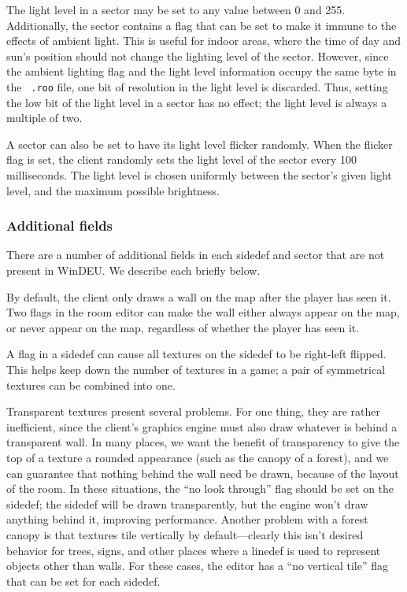 The light level in a sector may be set to any value between 0 and
255.  Additionally, the sector contains a flag that can be set to make
it immune to the effects of ambient light.  This is useful for indoor
areas, where the time of day and sun's position should not change the
lighting level of the sector.  However, since the ambient lighting
flag and the light level information occupy the same byte in the {\tt
.roo} file, one bit of resolution in the light level is discarded.
Thus, setting the low bit of the light level in a sector has no
effect; the light level is always a multiple of two.

A sector can also be set to have its light level flicker randomly.
When the flicker flag is set, the client randomly sets the light
level of the sector every 100 milliseconds.  The light level is chosen
uniformly between the sector's given light level, and the maximum
possible brightness.

\subsubsection{Additional fields}

There are a number of additional fields in each sidedef and sector
that are not present in WinDEU.  We describe each briefly below.

By default, the client only draws a wall on the map after the player
has seen it.  Two flags in the room editor can make the wall either
always appear on the map, or never appear on the map, regardless of
whether the player has seen it.

A flag in a sidedef can cause all textures on the sidedef to be
right-left flipped.  This helps keep down the number of textures in
a game; a pair of symmetrical textures can be combined into one.


Transparent textures present several problems.  For one thing, they
are rather inefficient, since the client's graphics engine must also
draw whatever is behind a transparent wall.  In many places, we want
the benefit of transparency to give the top of a texture a rounded
appearance (such as the canopy of a forest), and we can guarantee that
nothing behind the wall need be drawn, because of the layout of the
room.  In these situations, the ``no look through'' flag should be set
on the sidedef; the sidedef will be drawn transparently, but the
engine won't draw anything behind it, improving performance.  Another
problem with a forest canopy is that textures tile vertically by
default---clearly this isn't desired behavior for trees, signs, and
other places where a linedef is used to represent objects other than
walls.  For these cases, the editor has a ``no vertical tile'' flag
that can be set for each sidedef.

